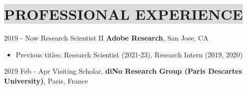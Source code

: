 \section*{
    \colorbox{gainsboro}{PROFESSIONAL EXPERIENCE}
}

2019 - Now \hspace{15mm} 
Research Scientist II \textbf{Adobe Research},  San Jose, CA
\vspace{-1mm}
\begin{itemize}[noitemsep,itemsep=0pt,topsep=0pt,leftmargin=38mm]
    \item Previous titles: Research Scientist (2021-23), Research Intern (2019, 2020)
\end{itemize}




2019 Feb - Apr \hspace{10mm} 
Visiting Scholar, \textbf{diNo Research Group (Paris Descartes University)}, Paris, France

